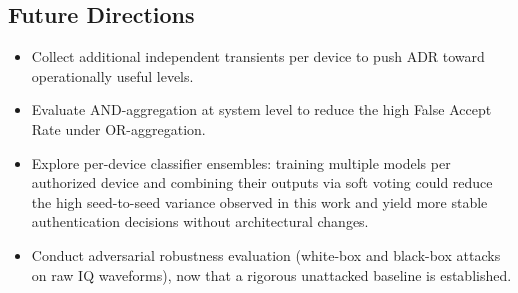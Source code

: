\subsection*{Future Directions}
\begin{itemize}
  \item Collect additional independent transients per device to push ADR toward
        operationally useful levels.
  \item Evaluate AND-aggregation at system level to reduce the high False Accept
        Rate under OR-aggregation.
  \item Explore per-device classifier ensembles: training multiple models per
        authorized device and combining their outputs via soft voting could
        reduce the high seed-to-seed variance observed in this work and yield
        more stable authentication decisions without architectural changes.
  \item Conduct adversarial robustness evaluation (white-box and black-box
        attacks on raw IQ waveforms), now that a rigorous unattacked baseline
        is established.
\end{itemize}
